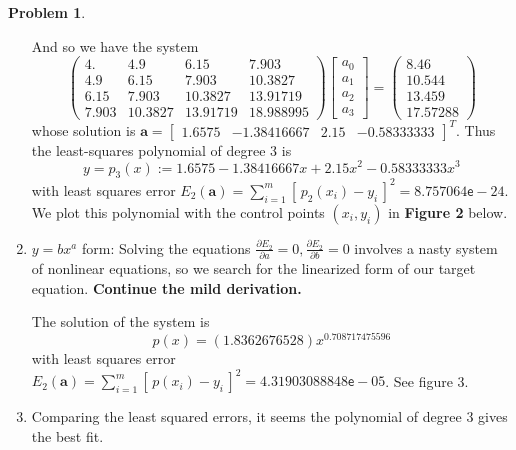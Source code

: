 \documentclass[10pt]{article}
\theoremstyle{plain}
\theoremstyle{definition}
\newtheorem{prob}{Problem}
\numberwithin{equation}{section}
\begin{document}
\begin{prob}
\begin{enumerate}[\bfseries(a)]
        And so we have the system
\[
\begin{pmatrix}
4.      &   4.9     &   6.15    &   7.903   \\
4.9     &   6.15    &   7.903   &  10.3827  \\
6.15    &   7.903   &  10.3827  &  13.91719 \\
7.903   &  10.3827  &  13.91719 &  18.988995
\end{pmatrix}
\begin{bmatrix} a_0 \\ a_1 \\ a_2 \\ a_3 \end{bmatrix}
= \begin{pmatrix} 8.46    \\ 10.544   \\ 13.459   \\ 17.57288 \end{pmatrix}
\]
whose solution is
$\bm{a} = \begin{bmatrix} 1.6575 & -1.38416667 & 2.15 & -0.58333333 \end{bmatrix}^T$. Thus
the least-squares polynomial of degree 3 is
\[
        \boxed{y = p_3(x) := 1.6575  - 1.38416667 x + 2.15 x^2  - 0.58333333 x^3}
\]
        with least squares error
        $E_2(\bm{a}) = \sum_{i=1}^m \left[\, p_2(x_i) - y_i\, \right]^2 =
            8.757064 \mathsf{e}-24$.
            We plot this polynomial with the control points $(x_i, y_i)$
            in \textbf{Figure 2} below.  \item   $y= bx^a$ form:
    Solving the equations $\frac{\partial E_2}{\partial a} = 0 , \frac{\partial E_2}{\partial b} = 0$
    involves a nasty system of nonlinear equations, so we search for the
    linearized form of our target equation. \textbf{Continue the mild derivation.}

    The solution of the system is
    \[\boxed{p(x) = (1.8362676528) x^{0.708717475596}}\]
    with least squares error
    $E_2(\bm{a}) = \sum_{i=1}^m \left[\, p(x_i) - y_i\, \right]^2 =  4.31903088848\mathsf{e}-05$.
    See figure 3.
\item Comparing the least squared errors, it seems the polynomial of degree 3 gives the best fit.
\end{enumerate}

\end{prob}
\end{document}
